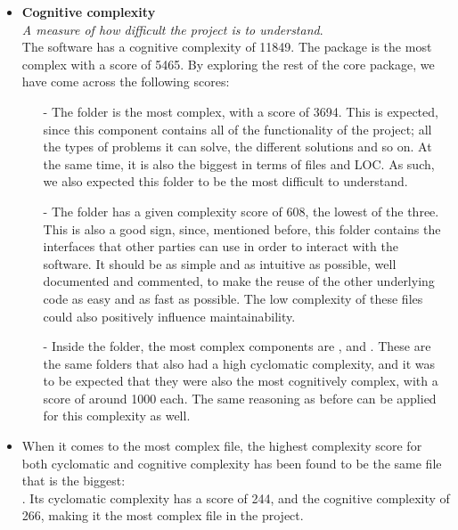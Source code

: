 \begin{itemize}
                \item \textbf{Cognitive complexity}\\
                \textit{A measure of how difficult the project is to understand}.\\ The software has a cognitive complexity of 11849. The  package is the most complex with a score of 5465.  
                By exploring the rest of the core package, we have come across the following scores:
                \begin{itemize}
                    \item[-] The  folder is the most complex, with a score of 3694. This is expected, since this component contains all of the functionality of the project; all the types of problems it can solve, the different solutions and so on. At the same time, it is also the biggest in terms of files and LOC. As such, we also expected this folder to be the most difficult to understand. 
                    
                    \item[-] The  folder has a given complexity score of 608, the lowest of the three. This is also a good sign, since, mentioned before, this folder contains the interfaces that other parties can use in order to interact with the software. It should be as simple and as intuitive as possible, well documented and commented, to make the reuse of the other underlying code as easy and as fast as possible. The low complexity of these files could also positively influence maintainability. 
                    
                    \item[-] Inside the  folder, the most complex components are ,  and . These are the same folders that also had a high cyclomatic complexity, and it was to be expected that they were also the most cognitively complex, with a score of around 1000 each. The same reasoning as before can be applied for this complexity as well.
                     
                \end{itemize}
                
                \item When it comes to the most complex file, the highest complexity score for both cyclomatic and cognitive complexity has been found to be the same file that is the biggest: \\
                .
                Its cyclomatic complexity has a score of 244, and the cognitive complexity of 266, making it the most complex file in the project.
            \end{itemize}
            
